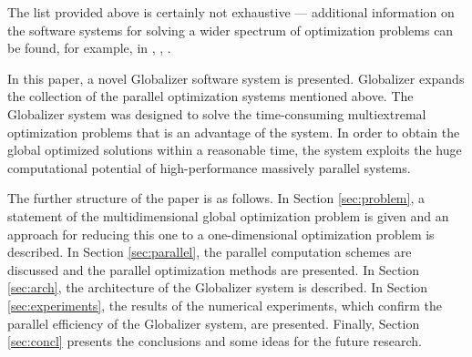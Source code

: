 \documentclass{naco}
\theoremstyle{definition}
\begin{document}
\par
The list provided above is certainly not exhaustive --- additional information on the
software systems for solving a wider spectrum of optimization problems can be found, for example, in
\cite{mongeauKarsentyRouze2000}, \cite{pinter2009}, \cite{riosSahinidis2013}.
\par
In this paper, a novel Globalizer software system is presented. Globalizer expands the collection of the parallel optimization systems mentioned above. The Globalizer system was designed to solve the time-consuming multiextremal optimization problems that is an advantage of the system. In order to obtain the global optimized solutions within a reasonable time, the system exploits the huge computational potential of high-performance massively parallel systems.

The further structure of the paper is as follows. In Section \ref{sec:problem},
a statement of the multidimensional global optimization problem is given and an
approach for reducing this one to a one-dimensional optimization problem is described.
In Section \ref{sec:parallel}, the parallel computation schemes are discussed and
the parallel optimization methods are presented. In Section \ref{sec:arch}, the architecture of
the Globalizer system is described. In Section \ref{sec:experiments}, the results of the numerical experiments,
which confirm the parallel efficiency of the Globalizer system, are presented. Finally,
Section \ref{sec:concl} presents the conclusions and some ideas for the future research.
\end{document}
